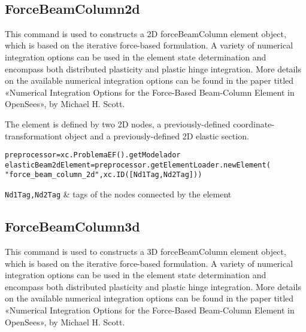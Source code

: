\begin{methodsTable}
\ElementMeth{}
\ElementOneDMeth{}
\getVDirEjeFuerteLocales{} \\
\getVDirEjeDebilLocales{} \\
\getAnguloEjeFuerte{} \\
\getAnguloEjeDebil{} \\
\getVDirEjeFuerteGlobales{} \\
\getVDirEjeDebilGlobales{} \\

\end{methodsTable}

\subsection{ForceBeamColumn2d}
This command is used to constructs a 2D forceBeamColumn element object, which is based on the iterative force-based formulation. A variety of numerical integration options can be used in the element state determination and encompass both distributed plasticity and plastic hinge integration. More details on the available numerical integration options can be found in the paper titled «Numerical Integration Options for the Force-Based Beam-Column Element in OpenSees», by Michael H. Scott.

The element is defined by two 2D nodes, a previously-defined coordinate-transformationt object and a previously-defined 2D elastic section.
\begin{verbatim}
preprocessor=xc.ProblemaEF().getModelador
elasticBeam2dElement=preprocessor.getElementLoader.newElement(
"force_beam_column_2d",xc.ID([Nd1Tag,Nd2Tag]))
\end{verbatim}
\begin{paramFuncTable}
{\tt Nd1Tag,Nd2Tag} & tags of the nodes connected by the element\\
\end{paramFuncTable}

\begin{paramClassTable}
\ElementParam{}
\ElementOneDParam{}
\rhoX{}
\end{paramClassTable}

\begin{methodsTable}
\ElementMeth{}
\ElementOneDMeth{}
\BeamColumnWithSectionFDMeth{}
\end{methodsTable}

\subsection{ForceBeamColumn3d}
This command is used to constructs a 3D forceBeamColumn element object, which is based on the iterative force-based formulation. A variety of numerical integration options can be used in the element state determination and encompass both distributed plasticity and plastic hinge integration. More details on the available numerical integration options can be found in the paper titled «Numerical Integration Options for the Force-Based Beam-Column Element in OpenSees», by Michael H. Scott. 

